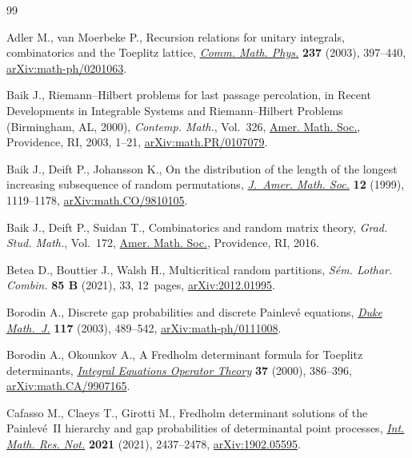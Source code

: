 \documentclass[pdftex]{sigma}%
\numberwithin{equation}{section}
\begin{document}
\begin{thebibliography}{99}
\footnotesize\itemsep=0pt

Adler M., van Moerbeke P., Recursion relations for unitary integrals,
 combinatorics and the {T}oeplitz lattice, \href{https://doi.org/10.1007/s00220-003-0818-4}{\textit{Comm. Math. Phys.}}
 \textbf{237} (2003), 397--440, \href{https://arxiv.org/abs/math-ph/0201063}{arXiv:math-ph/0201063}.

Baik J., Riemann--{H}ilbert problems for last passage percolation, in Recent
 Developments in Integrable Systems and {R}iemann--{H}ilbert Problems
 ({B}irmingham, {AL}, 2000), \textit{Contemp. Math.}, Vol.~326, \href{https://doi.org/10.1090/conm/326/05753}{Amer. Math.
 Soc.}, Providence, RI, 2003, 1--21, \href{https://arxiv.org/abs/math.PR/0107079}{arXiv:math.PR/0107079}.

Baik J., Deift P., Johansson K., On the distribution of the length of the
 longest increasing subsequence of random permutations, \href{https://doi.org/10.1090/S0894-0347-99-00307-0}{\textit{J.~Amer. Math.
 Soc.}} \textbf{12} (1999), 1119--1178, \href{https://arxiv.org/abs/math.CO/9810105}{arXiv:math.CO/9810105}.

Baik J., Deift P., Suidan T., Combinatorics and random matrix theory,
 \textit{Grad. Stud. Math.}, Vol.~172, \href{https://doi.org/10.1090/gsm/172}{Amer. Math. Soc.}, Providence, RI, 2016.

Betea D., Bouttier J., Walsh H., Multicritical random partitions,
 \textit{S\'em. Lothar. Combin.} \textbf{85 B} (2021), 33, 12~pages,
 \href{https://arxiv.org/abs/2012.01995}{arXiv:2012.01995}.

Borodin A., Discrete gap probabilities and discrete {P}ainlev\'e equations,
 \href{https://doi.org/10.1215/S0012-7094-03-11734-2}{\textit{Duke Math.~J.}} \textbf{117} (2003), 489--542,
 \href{https://arxiv.org/abs/math-ph/0111008}{arXiv:math-ph/0111008}.

Borodin A., Okounkov A., A {F}redholm determinant formula for {T}oeplitz
 determinants, \href{https://doi.org/10.1007/BF01192827}{\textit{Integral Equations Operator Theory}} \textbf{37} (2000),
 386--396, \href{https://arxiv.org/abs/math.CA/9907165}{arXiv:math.CA/9907165}.

Cafasso M., Claeys T., Girotti M., Fredholm determinant solutions of the
 {P}ainlev\'e~{II} hierarchy and gap probabilities of determinantal point
 processes, \href{https://doi.org/10.1093/imrn/rnz168}{\textit{Int. Math. Res. Not.}} \textbf{2021} (2021), 2437--2478,
 \href{https://arxiv.org/abs/1902.05595}{arXiv:1902.05595}.


\end{thebibliography}
\end{document}
